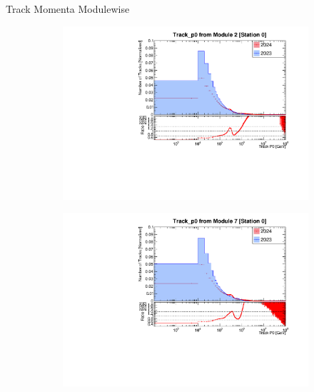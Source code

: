 \begin{frame}{Track Momenta Modulewise}
\begin{figure}
        \begin{subfigure}[t]{0.49\linewidth}
            \includegraphics[width=\linewidth]{./ModuleLevelPlots/Track_p0_st0_module2_linear.pdf}
        \end{subfigure}
        \begin{subfigure}[t]{0.49\linewidth}
            \includegraphics[width=\linewidth]{./ModuleLevelPlots/Track_p0_st0_module7_linear.pdf}
        \end{subfigure}
    \end{figure}
\end{frame}

